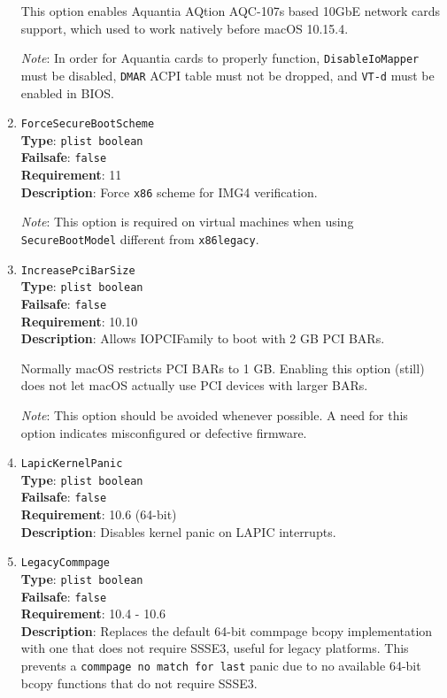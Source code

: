 \documentclass[]{article}
\begin{document}
\begin{enumerate}
  This option enables Aquantia AQtion AQC-107s based 10GbE network cards support,
  which used to work natively before macOS 10.15.4.

  \emph{Note}: In order for Aquantia cards to properly function,
  \texttt{DisableIoMapper} must be disabled, \texttt{DMAR} ACPI table must not be dropped,
  and \texttt{VT-d} must be enabled in BIOS.

\item
  \texttt{ForceSecureBootScheme}\\
  \textbf{Type}: \texttt{plist\ boolean}\\
  \textbf{Failsafe}: \texttt{false}\\
  \textbf{Requirement}: 11\\
  \textbf{Description}: Force \texttt{x86} scheme for IMG4 verification.

  \emph{Note}: This option is required on virtual machines when using
  \texttt{SecureBootModel} different from \texttt{x86legacy}.

\item
  \texttt{IncreasePciBarSize}\\
  \textbf{Type}: \texttt{plist\ boolean}\\
  \textbf{Failsafe}: \texttt{false}\\
  \textbf{Requirement}: 10.10\\
  \textbf{Description}: Allows IOPCIFamily to boot with 2 GB PCI BARs.

  Normally macOS restricts PCI BARs to 1 GB. Enabling this option
  (still) does not let macOS actually use PCI devices with larger BARs.

  \emph{Note}: This option should be avoided whenever possible. A need for this option
  indicates misconfigured or defective firmware.

\item
  \texttt{LapicKernelPanic}\\
  \textbf{Type}: \texttt{plist\ boolean}\\
  \textbf{Failsafe}: \texttt{false}\\
  \textbf{Requirement}: 10.6 (64-bit)\\
  \textbf{Description}: Disables kernel panic on LAPIC interrupts.

\item
  \texttt{LegacyCommpage}\\
  \textbf{Type}: \texttt{plist\ boolean}\\
  \textbf{Failsafe}: \texttt{false}\\
  \textbf{Requirement}: 10.4 - 10.6\\
  \textbf{Description}: Replaces the default 64-bit commpage bcopy implementation with
  one that does not require SSSE3, useful for legacy platforms. This prevents a
  \texttt{commpage no match for last} panic due to no available 64-bit bcopy functions
  that do not require SSSE3.


\end{enumerate}
\end{document}
